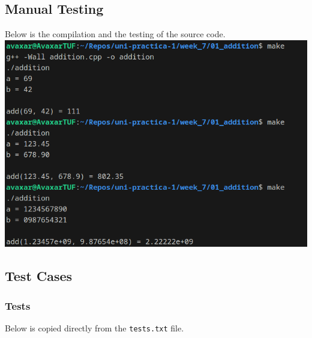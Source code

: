 \documentclass[12pt]{article}
\begin{document}
\subsection{Manual Testing}
Below is the compilation and the testing of the source code.
\newline\includegraphics[width=\textwidth]{01_addition}

\pagebreak
\subsection{Test Cases}

\subsubsection{Tests}
Below is copied directly from the \texttt{tests.txt} file.
\inputminted{text}{01_addition/tests.txt}
\end{document}
